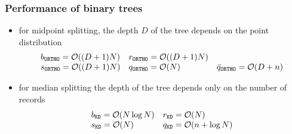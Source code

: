 \begin{frame}[fragile]
%
  \frametitle{Performance of binary trees}
%
  \begin{itemize}
%
  \item for midpoint splitting, the depth $D$ of the tree depends on the point distribution
    \begin{equation*}
      \begin{array}{lll}
        b_{{\tt ORTHO}} = \mbox{$\mathcal{O}((D+1)N)$} &
        r_{{\tt ORTHO}} = \mbox{$\mathcal{O}((D+1)N)$}  \\
        s_{{\tt ORTHO}} = \mbox{$\mathcal{O}((D+1)N)$} &
        q_{{\tt ORTHO}} = \mbox{$\mathcal{O}(N)$} &
        \bar{q}_{{\tt ORTHO}} = \mbox{$\mathcal{O}(D+n)$}
      \end{array}
    \end{equation*}
%
  \item for median splitting the depth of the tree depends only on the number of records
    \begin{equation*}
      \begin{array}{ll}
        b_{{\tt KD}} = \mbox{$\mathcal{O}(N \log N)$} &
        r_{{\tt KD}} = \mbox{$\mathcal{O}(N)$}  \\
        s_{{\tt KD}} = \mbox{$\mathcal{O}(N)$} &
        q_{{\tt KD}} = \mbox{$\mathcal{O}(n + \log N)$}
      \end{array}
    \end{equation*}
%
  \end{itemize}
%
\end{frame}

